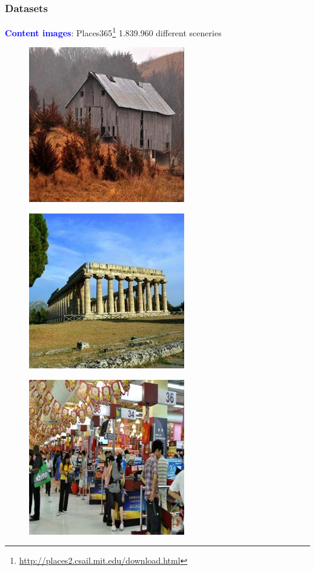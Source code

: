 \documentclass[11pt,xcolor=dvipsnames]{beamer}
\begin{document}
\begin{frame}
\frametitle{Datasets}

\textcolor{blue}{\textbf{Content images}}: Places365\footnote{\url{http://places2.csail.mit.edu/download.html}} 1.839.960 different sceneries

\begin{multicols*}{3}

\begin{figure}
	\includegraphics[width=0.5\linewidth]{places0.jpg}
\end{figure}

\columnbreak

\begin{figure}
	\includegraphics[width=0.5 \linewidth]{places1.jpg}
\end{figure}

\columnbreak

\begin{figure}
	\includegraphics[width=0.5\linewidth]{places2.jpg}
\end{figure}


\end{multicols*}
\end{frame}
\end{document}
